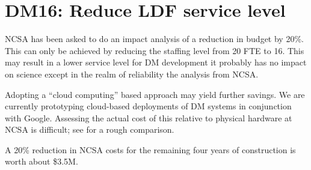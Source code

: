 \section{DM16: Reduce LDF service level}\label{sect:dm16}

NCSA has been  asked to do an impact analysis of a reduction in budget by 20\%.
This can only be achieved by reducing the staffing level from 20 FTE to 16.
This may result in a lower service level for DM development  it probably has no impact on science\newtext{,} except in the realm of reliability
  the analysis from NCSA.

Adopting a ``cloud computing'' based approach may yield further savings.
We are currently prototyping cloud-based deployments of DM systems in conjunction with Google.
Assessing the actual cost of this relative to physical hardware at NCSA is difficult; see  for a rough comparison.

A 20\% reduction in NCSA costs for the remaining four years of construction is worth about \$3.5M.
